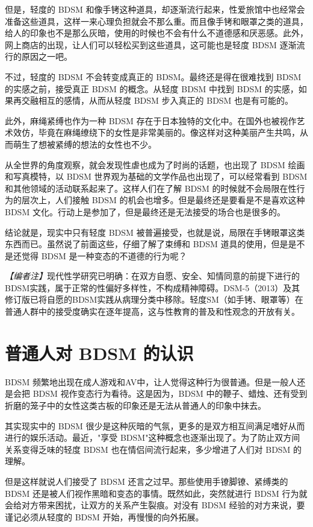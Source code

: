 \documentclass[12pt,UTF8]{ctexbook}
\begin{document}
但是，轻度的 BDSM 和像手铐这种道具，却逐渐流行起来，性爱旅馆中也经常会准备这些道具，这样一来心理负担就会不那么重。而且像手铐和眼罩之类的道具，给人的印象也不是那么灰暗，使用的时候也不会有什么不道德感和厌恶感。此外，网上商店的出现，让人们可以轻松买到这些道具，这可能也是轻度 BDSM 逐渐流行的原因之一吧。

不过，轻度的 BDSM 不会转变成真正的 BDSM。最终还是得在很难找到 BDSM 的实感之前，接受真正 BDSM 的概念。从轻度 BDSM 中找到 BDSM 的实感，如果再交融相互的感情，从而从轻度 BDSM 步入真正的 BDSM 也是有可能的。

此外，麻绳紧缚也作为一种 BDSM 存在于日本独特的文化中。在国外也被视作艺术效仿，毕竟在麻绳缭绕下的女性是非常美丽的。像这样对这种美丽产生共鸣，从而萌生了想被紧缚的想法的女性也不少。

从全世界的角度观察，就会发现性虐也成为了时尚的话题，也出现了 BDSM 绘画和写真模特，以 BDSM 世界观为基础的文学作品也出现了，可以经常看到 BDSM 和其他领域的活动联系起来了。这样人们在了解 BDSM 的时候就不会局限在性行为的层次上，人们接触 BDSM 的机会也增多。但是最终还是要看是不是喜欢这种 BDSM 文化。行动上是参加了，但是最终还是无法接受的场合也是很多的。

结论就是，现实中只有轻度 BDSM 被普遍接受，也就是说，局限在手铐眼罩这类东西而已。虽然说了前面这些，仔细了解了束缚和 BDSM 道具的使用，但是是不是还觉得 BDSM 是一种变态的不道德的行为呢？

\textit{【编者注】}现代性学研究已明确：在双方自愿、安全、知情同意的前提下进行的BDSM实践，属于正常的性偏好多样性，不构成精神障碍。DSM-5（2013）及其修订版已将自愿的BDSM实践从病理分类中移除\citep{apa2022dsm5tr}。轻度SM（如手铐、眼罩等）在普通人群中的接受度确实在逐年提高，这与性教育的普及和性观念的开放有关。

\section{普通人对 BDSM 的认识}

BDSM 频繁地出现在成人游戏和AV中，让人觉得这种行为很普通。但是一般人还是会把 BDSM 视作变态行为看待。这是因为，BDSM 中的鞭子、蜡烛、还有受到折磨的笼子中的女性这类古板的印象还是无法从普通人的印象中抹去。

其实现实中的 BDSM 很少是这种灰暗的气氛，更多的是双方相互间满足嗜好从而进行的娱乐活动。最近，"享受 BDSM"这种概念也逐渐出现了。为了防止双方间关系变得乏味的轻度 BDSM 也在情侣间流行起来，多少增进了人们对 BDSM 的理解。

但是这样就说人们接受了 BDSM 还言之过早。那些使用手镣脚镣、紧缚类的 BDSM 还是被人们视作黑暗和变态的事情。既然如此，突然就进行 BDSM 行为就会给对方带来困扰，让双方的关系产生裂痕。对没有 BDSM 经验的对方来说，要谨记必须从轻度的 BDSM 开始，再慢慢的向外拓展。
\end{document}
